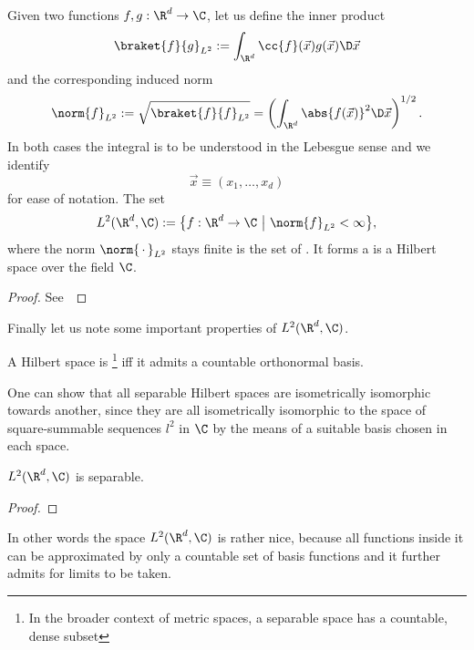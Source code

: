 \begin{prop}
	\label{prop:L2HilbertSpace}
	Given two functions $f, g : \R^d \to \C$,
	let us define the inner product
	\begin{equation}
		\braket{f}{g}_{L^2} := \int_{\R^d} \cc{f}(\vec{x}) g(\vec{x}) \D \vec{x}
		\label{eqn:defL2InnProd}
	\end{equation}
	and the corresponding induced norm
	\begin{equation}
		\norm{f}_{L^2} := \sqrt{\braket{f}{f}_{L^2}} = \left( \int_{\R^d} \abs{f(\vec{x})}^2 \D \vec{x} \right)^{1/2}.
		\label{eqn:defL2Norm}
	\end{equation}
	In both cases the integral is to be understood in the Lebesgue sense
	and we identify
	\[ \vec{x} \equiv (x_1, \ldots, x_d) \]
	for ease of notation. The set
	\[ L^2(\R^d, \C) := \big\{ f : \R^d \to \C ~\big|~ \norm{f}_{L^2} < \infty \big\}, \]
	where the norm $\norm{\slot}_{L^2}$ stays finite
	is the set of .
	It forms a is a Hilbert space over the field $\C$.
	\begin{proof}
		See~\cite{Adams2003}
	\end{proof}
\end{prop}

Finally let us note some important properties of $L^2(\R^d, \C)$.

\begin{defn}
	A Hilbert space is %
	\footnote{In the broader context of metric spaces,
	a separable space has a countable, dense subset}
	iff it admits a countable orthonormal basis.
\end{defn}
One can show that all separable Hilbert spaces are
isometrically isomorphic towards another,
since they are all isometrically isomorphic to the space of
square-summable sequences $l^2$ in $\C$
by the means of a suitable basis chosen in each space.

\begin{prop}
	$L^2(\R^d, \C)$ is separable.
	\begin{proof}
	\end{proof}
\end{prop}

In other words the space $L^2(\R^d, \C)$ is rather nice,
because all functions inside it can be approximated
by only a countable set of basis functions
and it further admits for limits to be taken.

